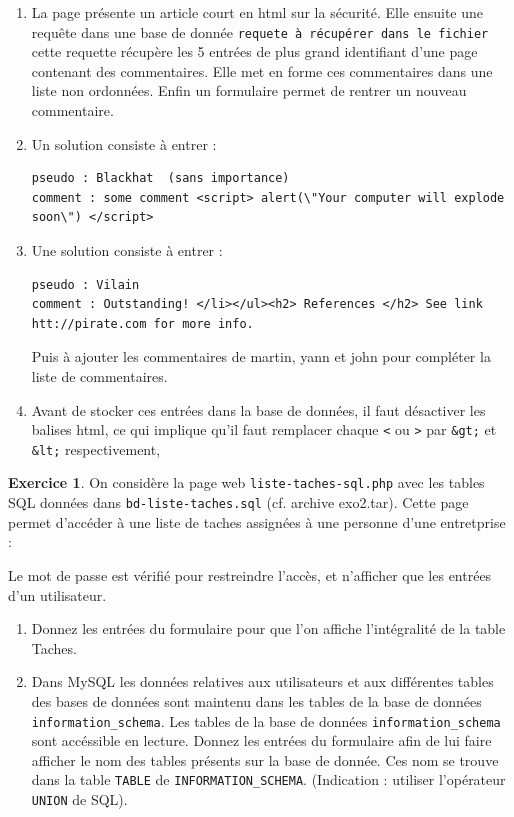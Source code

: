 \documentclass[a4paper,9pt]{article}
\theoremstyle{plain}
\theoremstyle{definition}
\newtheorem{exercice}{Exercice}
\begin{document}
\begin{correction}
\begin{enumerate}
\item La page présente un article court en html sur la sécurité. Elle ensuite une requête dans une base de donnée
\verb|requete à récupérer dans le fichier|
  cette requette récupère les 5 entrées de plus grand identifiant d'une page contenant des commentaires.  Elle met en forme ces commentaires dans une liste non ordonnées. Enfin un formulaire permet de rentrer un nouveau commentaire.
\item Un solution consiste à entrer :
\begin{verbatim}
pseudo : Blackhat  (sans importance)
comment : some comment <script> alert(\"Your computer will explode soon\") </script>
\end{verbatim}
\item Une solution consiste à entrer :
\begin{verbatim}
pseudo : Vilain
comment : Outstanding! </li></ul><h2> References </h2> See link htt://pirate.com for more info.
\end{verbatim}
Puis à ajouter les commentaires de martin, yann et john pour compléter la liste de commentaires.
\item Avant de stocker ces entrées dans la base de données,  il faut désactiver les balises html, ce qui implique qu'il faut remplacer chaque \verb|<| ou \verb|>| par \verb|&gt;| et \verb|&lt;| respectivement, 
  \end{enumerate}
\end{correction}



\begin{exercice}
  On considère la page web \verb|liste-taches-sql.php| avec les tables SQL données dans \verb|bd-liste-taches.sql| (cf. archive exo2.tar). Cette page permet d'accéder à une liste de taches assignées à une personne d'une entretprise :
\begin{small}
    
    \end{small}
Le mot de passe est vérifié pour restreindre l'accès, et n'afficher que les entrées d'un utilisateur.
\begin{enumerate}
\item Donnez les entrées du formulaire pour que l'on affiche l'intégralité de la table Taches.
\item  Dans MySQL les données relatives aux utilisateurs et aux différentes tables des bases de données  sont maintenu dans les tables de la base de données \verb|information_schema|. Les tables de la base de données \verb|information_schema| sont accéssible en lecture. Donnez les entrées du formulaire afin de lui faire afficher le nom des tables présents sur la base de donnée. Ces nom se trouve dans la table \verb|TABLE| de \verb|INFORMATION_SCHEMA|. (Indication : utiliser l'opérateur \verb|UNION| de SQL). 

\end{enumerate}
\end{exercice}
\end{document}

